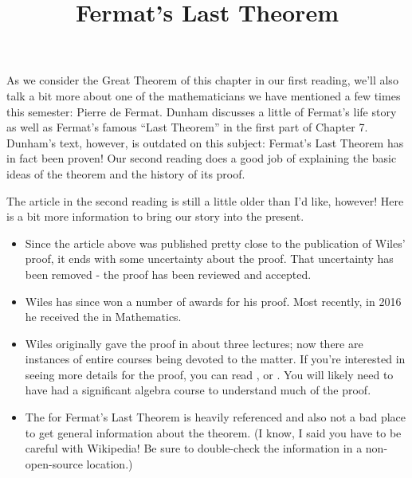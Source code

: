 \documentclass[nooutcomes]{ximera}
\title{Fermat's Last Theorem}
\begin{document}
\begin{abstract}
    
\end{abstract}
\maketitle

As we consider the Great Theorem of this chapter in our first reading,
we'll also talk a bit more about one of the mathematicians we have
mentioned a few times this semester: Pierre de Fermat.  Dunham discusses 
a little of Fermat's life story as well as Fermat's famous ``Last Theorem'' 
in the first part of Chapter 7. Dunham's text, however, is outdated on 
this subject: Fermat's Last Theorem has in fact been proven!  Our second
reading does a good job of explaining the basic ideas of the theorem
and the history of its proof.

The article in the second reading is still a little older than I'd like, 
however!  Here is a bit more information to bring our story into the present.
\begin{itemize}
	\item Since the article above was published pretty close to
          the publication of Wiles' proof, it ends with some
          uncertainty about the proof.  That uncertainty has been
          removed - the proof has been reviewed and accepted.
	\item Wiles has since won a number of awards for his proof.  Most recently, in 2016 he received the  in Mathematics.  
	\item Wiles originally gave the proof in about three lectures; now 
	there are instances of entire courses being devoted to the matter.  
	If you're interested in seeing more details for the proof, you can read 
	, 
	or .  
	You will likely need to have had a significant algebra course to understand much of the proof.
	\item The  for Fermat's Last Theorem is heavily referenced and also not a bad place to get general information about the theorem.  (I know, I said you have to be careful with Wikipedia!  Be sure to double-check the information in a non-open-source location.)
\end{itemize}
\end{document}
